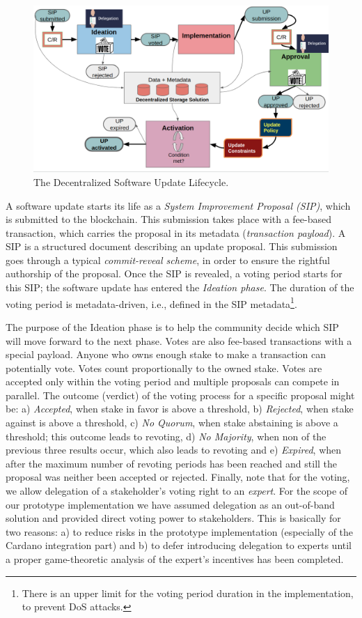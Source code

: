 \begin{figure}[h!] %
	\centering
	\includegraphics[width=0.8\columnwidth,
	keepaspectratio]{figures/software_update_lifecycle.png}
	\caption{The Decentralized Software Update Lifecycle.}
	\label{fig:su_lifecycle}
\end{figure}

A software update starts its life as a \emph{System Improvement Proposal
	(SIP)}, which is submitted to the blockchain. This submission takes place 
with
a fee-based transaction, which carries the proposal in its metadata
(\emph{transaction payload}). A SIP is a structured document
describing an update proposal. This submission goes through a typical
\emph{commit-reveal scheme}, in order to ensure the rightful authorship of the
proposal. Once the SIP is revealed, a voting period starts for this SIP; the
software update has entered the \emph{Ideation phase}. The duration of the
voting period is metadata-driven, i.e., defined in the SIP
metadata\footnote{There is an upper limit for the voting period duration in the
	implementation, to prevent DoS attacks.}.

The purpose of the Ideation phase is to help the community decide which SIP
will move forward to the next phase. Votes are also fee-based transactions with
a special payload. Anyone who owns enough stake to make a transaction can
potentially vote. Votes count proportionally to the owned stake. Votes are
accepted only within the voting period and multiple proposals can compete in
parallel. The outcome (verdict) of the voting process for a specific proposal
might be: a) \emph{Accepted}, when stake in favor is above a threshold, b)
\emph{Rejected}, when stake against is above a threshold, c) \emph{No Quorum},
when stake abstaining is above a threshold; this outcome leads to revoting, d)
\emph{No Majority}, when non of the previous three results occur, which also
leads to revoting and e) \emph{Expired}, when after the maximum number of
revoting periods has been reached and still the proposal was neither been
accepted or rejected. Finally, note that for the voting, we allow delegation of
a stakeholder's voting right to an \emph{expert}. For the scope of our
prototype implementation we have assumed delegation as an out-of-band solution
and provided direct voting power to stakeholders. This is basically for two
reasons: a) to reduce risks in the prototype implementation (especially of the
Cardano integration part) and b) to defer introducing delegation to experts
until a proper game-theoretic analysis of the expert's incentives has been
completed.

